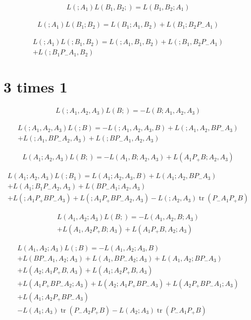 \documentclass[b5paper,draft,openbib,12pt]{memoir}
\DeclareMathOperator{\tr}{tr}
\begin{document}
\begin{multline}
L(;A_1)L(B_1,B_2;)=L(B_1,B_2;A_1)
\end{multline}

\begin{multline}
L(;A_1)L(B_1;B_2)=L(B_1;A_1,B_2) + L(B_1;B_2P_-A_1)
\end{multline}

\begin{multline}
L(;A_1)L(;B_1,B_2) = L(;A_1,B_1,B_2) + L(;B_1,B_2P_-A_1) \\
+ L(;B_1P_-A_1,B_2)
\end{multline}

\section{3 times 1}
\begin{multline}
L(;A_1,A_2,A_3)L(B;)= -L(B;A_1,A_2,A_3)
\end{multline}

\begin{multline}
L(;A_1,A_2,A_3)L(;B) = -L(;A_1,A_2,A_3,B) +L(;A_1,A_2,BP_-A_3)\\
+L(;A_1,BP_-A_2,A_3)+L(;BP_-A_1,A_2,A_3)
\end{multline}

\begin{multline}
L(A_1;A_2,A_3)L(B;)=-L(A_1,B;A_2,A_3)+L(A_1P_+B;A_2,A_3)
\end{multline}

\begin{multline}
L(A_1;A_2,A_3)L(;B_1)= L(A_1;A_2,A_3,B) + L(A_1;A_2,BP_-A_3) \\
+ L(A_1;B_1P_-A_2,A_3) + L(BP_-A_1;A_2,A_3) \\
+L(;A_1P_+BP_-A_3) + L(;A_1P_+BP_-A_2,A_3) - L(;A_2,A_3) \tr(P_-A_1P_+B)
\end{multline}

\begin{multline}
L(A_1,A_2;A_3)L(B;)=-L(A_1,A_2,B;A_3) \\
+ L(A_1,A_2P_+B;A_3) + L(A_1P_+B,A_2;A_3)
\end{multline}

\begin{multline}
L(A_1,A_2;A_3)L(;B) = -L(A_1,A_2;A_3,B) \\
+ L(BP_-A_1,A_2;A_3) + L(A_1, BP_-A_2;A_3) + L(A_1,A_2;BP_-A_3)\\
+L(A_2;A_1P_+B,A_3) + L(A_1;A_2P_+B,A_3)\\
+L(A_1P_+BP_-A_2;A_3) + L(A_2;A_1P_+BP_-A_3) + L(A_2P_+BP_-A_1;A_3)\\
+L(A_1;A_2P_+BP_-A_3)\\
-L(A_1;A_3) \tr(P_-A_2P_+B) - L(A_2;A_3) \tr(P_-A_1P_+B)
\end{multline}
\end{document}
